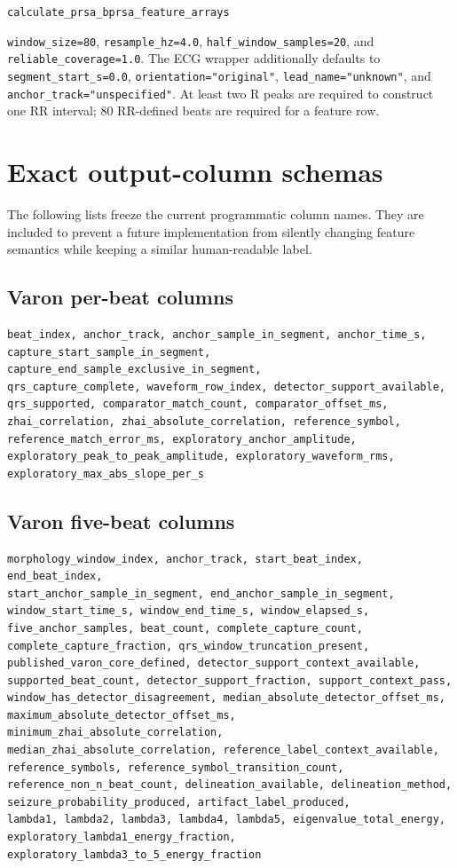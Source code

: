 \documentclass[11pt,a4paper]{article}
\begin{document}
\texttt{calculate\_prsa\_bprsa\_feature\_arrays}

\hspace*{1em}\texttt{window\_size=80}, \texttt{resample\_hz=4.0},
\texttt{half\_window\_samples=20}, and
\texttt{reliable\_coverage=1.0}. The ECG wrapper additionally defaults to
\texttt{segment\_start\_s=0.0}, \texttt{orientation="original"},
\texttt{lead\_name="unknown"}, and
\texttt{anchor\_track="unspecified"}. At least two R peaks are required to
construct one RR interval; 80 RR-defined beats are required for a feature row.

\section{Exact output-column schemas}

The following lists freeze the current programmatic column names. They are
included to prevent a future implementation from silently changing feature
semantics while keeping a similar human-readable label.

\subsection{Varon per-beat columns}

\begin{lstlisting}
beat_index, anchor_track, anchor_sample_in_segment, anchor_time_s,
capture_start_sample_in_segment, capture_end_sample_exclusive_in_segment,
qrs_capture_complete, waveform_row_index, detector_support_available,
qrs_supported, comparator_match_count, comparator_offset_ms,
zhai_correlation, zhai_absolute_correlation, reference_symbol,
reference_match_error_ms, exploratory_anchor_amplitude,
exploratory_peak_to_peak_amplitude, exploratory_waveform_rms,
exploratory_max_abs_slope_per_s
\end{lstlisting}

\subsection{Varon five-beat columns}

\begin{lstlisting}
morphology_window_index, anchor_track, start_beat_index, end_beat_index,
start_anchor_sample_in_segment, end_anchor_sample_in_segment,
window_start_time_s, window_end_time_s, window_elapsed_s,
five_anchor_samples, beat_count, complete_capture_count,
complete_capture_fraction, qrs_window_truncation_present,
published_varon_core_defined, detector_support_context_available,
supported_beat_count, detector_support_fraction, support_context_pass,
window_has_detector_disagreement, median_absolute_detector_offset_ms,
maximum_absolute_detector_offset_ms, minimum_zhai_absolute_correlation,
median_zhai_absolute_correlation, reference_label_context_available,
reference_symbols, reference_symbol_transition_count,
reference_non_n_beat_count, delineation_available, delineation_method,
seizure_probability_produced, artifact_label_produced,
lambda1, lambda2, lambda3, lambda4, lambda5, eigenvalue_total_energy,
exploratory_lambda1_energy_fraction,
exploratory_lambda3_to_5_energy_fraction
\end{lstlisting}
\end{document}
